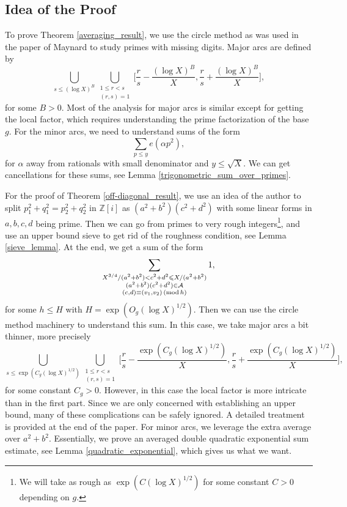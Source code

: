 \documentclass[12pt]{amsart}
\theoremstyle{definition}
\theoremstyle{definition}
\theoremstyle{remark}
\numberwithin{equation}{section}
\newcommand{\Z}{\mathbb{Z}}
\newcommand{\CA}{\mathcal{A}}
\renewcommand{\leq}{\leqslant}
\renewcommand{\mod}[1]{\,({\rm mod}\,#1)}
\begin{document}
\subsection{Idea of the Proof}
To prove Theorem \ref{averaging_result}, we use the circle method as was used in the paper of Maynard \cite{MR4452438} to study primes with missing digits. Major arcs are defined by
$$ \bigcup_{s\leq (\log X)^B} \bigcup_{\substack{ 1 \leq r < s \\ (r,s)=1}} \bigg[ \frac{r}{s} - \frac{(\log X)^B}{X} , \frac{r}{s} + \frac{(\log X)^B}{X} \bigg] ,$$
for some $B>0$. Most of the analysis for major arcs is similar except for getting the local factor, which requires understanding the prime factorization of the base $g$. For the minor arcs, we need to understand sums of the form
$$ \sum_{p\leq y} e(\alpha p^2) ,$$
for $\alpha$ away from rationals with small denominator and $y\leq \sqrt{X}$. We can get cancellations for these sums, see Lemma \ref{trigonometric_sum_over_primes}.

For the proof of Theorem \ref{off-diagonal_result}, we use an idea of the author \cite{MR4756119} to split $p_1^2+q_1^2=p_2^2+q_2^2$ in $\Z[i]$ as $(a^2+b^2)(c^2+d^2)$ with some linear forms in $a,b,c,d$ being prime. Then we can go from primes to very rough integers\footnote{We will take as rough as $\exp(C(\log X)^{1/2})$ for some constant $C>0$ depending on $g$.}, and use an upper bound sieve to get rid of the roughness condition, see Lemma \ref{sieve_lemma}. At the end, we get a sum of the form
$$ \sum_{\substack{X^{3/4}/(a^2+b^2) < c^2+d^2 \leq X/(a^2+b^2) \\ (a^2+b^2)(c^2+d^2)\in \CA \\ (c,d)\equiv (v_1,v_2)\mod h}} 1, $$ 
for some $h\leq H$ with $H=\exp(O_g(\log X)^{1/2})$. Then we can use the circle method machinery to understand this sum. In this case, we take major arcs a bit thinner, more precisely
$$ \bigcup_{s\leq \exp(C_g(\log X)^{1/2})} \bigcup_{\substack{1\leq r < s \\ (r,s)=1}} \bigg[ \frac{r}{s} - \frac{\exp(C_g(\log X)^{1/2})}{X} , \frac{r}{s} + \frac{\exp(C_g(\log X)^{1/2})}{X} \bigg] ,$$
for some constant $C_g>0$. However, in this case the local factor is more intricate than in the first part. Since we are only concerned with establishing an upper bound, many of these complications can be safely ignored. A detailed treatment is provided at the end of the paper. For minor arcs, we leverage the extra average over $a^2+b^2$. Essentially, we prove an averaged double quadratic exponential sum estimate, see Lemma \ref{quadratic_exponential}, which gives us what we want.
\end{document}
